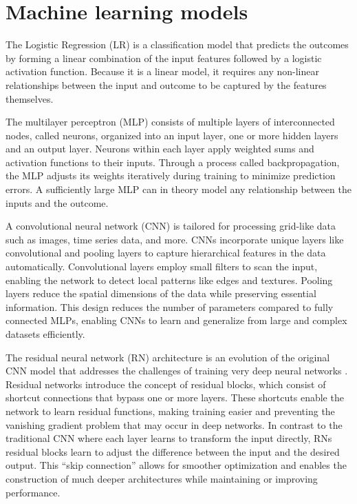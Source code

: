 \documentclass[preprint]{elsarticle}
\begin{document}
\section{Machine learning models}
The Logistic Regression (LR) is a classification model that predicts the outcomes by forming a linear combination of the input features followed by a logistic activation function. Because it is a linear model, it requires any non-linear relationships between the input and outcome to be captured by the features themselves. 

The multilayer perceptron (MLP) consists of multiple layers of interconnected nodes, called neurons, organized into an input layer, one or more hidden layers and an output layer. Neurons within each layer apply weighted sums and activation functions to their inputs. Through a process called backpropagation, the MLP adjusts its weights iteratively during training to minimize prediction errors. A sufficiently large MLP can in theory model any relationship between the inputs and the outcome. 

A convolutional neural network (CNN) is tailored for processing grid-like data such as images, time series data, and more. CNNs incorporate unique layers like convolutional and pooling layers to capture hierarchical features in the data automatically. Convolutional layers employ small filters to scan the input, enabling the network to detect local patterns like edges and textures. Pooling layers reduce the spatial dimensions of the data while preserving essential information. This design reduces the number of parameters compared to fully connected MLPs, enabling CNNs to learn and generalize from large and complex datasets efficiently.

The residual neural network (RN) architecture is an evolution of the original CNN model that addresses the challenges of training very deep neural networks \citep{he2016}. Residual networks introduce the concept of residual blocks, which consist of shortcut connections that bypass one or more layers. These shortcuts enable the network to learn residual functions, making training easier and preventing the vanishing gradient problem that may occur in deep networks. In contrast to the traditional CNN where each layer learns to transform the input directly, RNs residual blocks learn to adjust the difference between the input and the desired output. This ``skip connection'' allows for smoother optimization and enables the construction of much deeper architectures while maintaining or improving performance.
\end{document}
